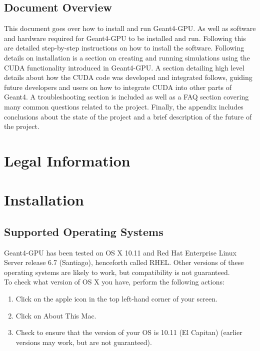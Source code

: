 \documentclass[12pt]{article}
\begin{document}
\subsection{Document Overview} %
This document goes over how to install and run Geant4-GPU. As well as software and hardware required for Geant4-GPU to be installed and run. Following this are detailed step-by-step instructions on how to install the software. Following details on installation is a section on creating and running simulations using the CUDA functionality introduced in Geant4-GPU. A section detailing high level details about how the CUDA code was developed and integrated follows, guiding future developers and users on how to integrate CUDA into other parts of Geant4. A troubleshooting section is included as well as a FAQ section covering many common questions related to the project. Finally, the appendix includes conclusions about the state of the project and a brief description of the future of the project.

\section{Legal Information}	%

\section{Installation} %

\subsection{Supported Operating Systems} %
Geant4-GPU has been tested on OS X 10.11 and Red Hat Enterprise Linux Server release 6.7 (Santiago), henceforth called RHEL. Other versions of these operating systems are likely to work, but compatibility is not guaranteed.\\

To check what version of OS X you have, perform the following actions:

\begin{enumerate}
\item Click on the apple icon in the top left-hand corner of your screen.
\item Click on About This Mac.
\item Check to ensure that the version of your OS is 10.11 (El Capitan) (earlier versions may work, but are not guaranteed).
\end{enumerate}
\end{document}
